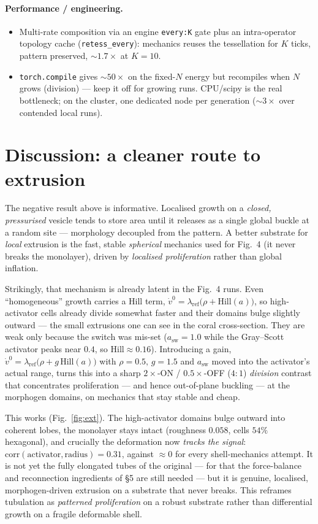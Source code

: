 \documentclass[11pt]{article}
\begin{document}
\paragraph{Performance / engineering.}
\begin{itemize}\itemsep2pt
\item Multi-rate composition via an engine \texttt{every:K} gate plus an intra-operator topology
cache (\texttt{retess\_every}): mechanics reuses the tessellation for $K$ ticks, pattern preserved,
$\sim\!1.7\times$ at $K\!=\!10$.
\item \texttt{torch.compile} gives $\sim\!50\times$ on the fixed-$N$ energy but recompiles when $N$
grows (division) --- keep it off for growing runs. CPU/scipy is the real bottleneck; on the cluster,
one dedicated node per generation ($\sim\!3\times$ over contended local runs).
\end{itemize}

\section{Discussion: a cleaner route to extrusion}
The negative result above is informative. Localised growth on a \emph{closed, pressurised} vesicle
tends to store area until it releases as a single global buckle at a random site --- morphology
decoupled from the pattern. A better substrate for \emph{local} extrusion is the fast, stable
\emph{spherical} mechanics used for Fig.~4 (it never breaks the monolayer), driven by \emph{localised
proliferation} rather than global inflation.

Strikingly, that mechanism is already latent in the Fig.~4 runs. Even ``homogeneous'' growth carries
a Hill term, $\dot v^0 = \lambda_{\text{ref}}\big(\rho + \mathrm{Hill}(a)\big)$, so high-activator
cells already divide somewhat faster and their domains bulge slightly outward --- the small
extrusions one can see in the coral cross-section. They are weak only because the switch was mis-set
($a_{\text{sw}}\!=\!1.0$ while the Gray--Scott activator peaks near $0.4$, so $\mathrm{Hill}\approx
0.16$). Introducing a gain, $\dot v^0 = \lambda_{\text{ref}}\big(\rho + g\,\mathrm{Hill}(a)\big)$
with $\rho\!=\!0.5,\,g\!=\!1.5$ and $a_{\text{sw}}$ moved into the activator's actual range, turns
this into a sharp $2\times$-ON / $0.5\times$-OFF ($4{:}1$) \emph{division} contrast that concentrates
proliferation --- and hence out-of-plane buckling --- at the morphogen domains, on mechanics that
stay stable and cheap.

This works (Fig.~\ref{fig:ext}). The high-activator domains bulge outward into coherent lobes, the
monolayer stays intact (roughness $0.058$, cells $54\%$ hexagonal), and crucially the deformation now
\emph{tracks the signal}: $\mathrm{corr}(\text{activator},\text{radius})\!=\!0.31$, against
$\approx\!0$ for every shell-mechanics attempt. It is not yet the fully elongated tubes of the
original --- for that the force-balance and reconnection ingredients of \S5 are still needed --- but
it is genuine, localised, morphogen-driven extrusion on a substrate that never breaks. This reframes
tubulation as \emph{patterned proliferation} on a robust substrate rather than differential growth on
a fragile deformable shell.
\end{document}
